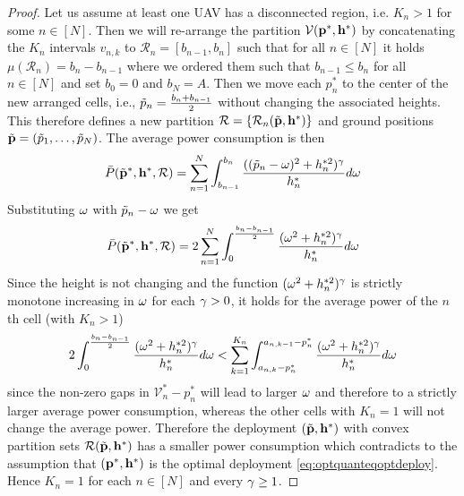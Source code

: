 \documentclass[smallabstract,smallcaptions]{dccpaper}
\newcommand{\Pbar}{\ensuremath{\bar{P}}}         %
\newcommand{\Vor}{\ensuremath{\mathcal{V}}}         %
\newcommand{\Rset}{\ensuremath{\mathcal R}}
\begin{document}
\begin{proof}
  Let us assume at least one UAV has a disconnected region, i.e. $K_n>1$ for some $n\in[N]$. Then we will re-arrange the
  partition $\Vor(\vp^*,\vh^*)$ by concatenating the $K_n$ intervals $v_{n,k}$ to $\Rset_n=[b_{n-1},b_{n}]$ such that for
  all $n\in[N]$ it holds $\mu(\Rset_n)=b_n-b_{n-1}$ where we ordered them such that $b_{n-1}\leq b_{n}$ for all $n\in[N]$
  and set $b_0=0$ and $b_N=A$. Then we move each $p_n^*$ to the center of the new arranged cells, i.e.,
  $\tilde{p}_n=\frac{b_n+b_{n-1}}{2}$ without changing the associated heights. This therefore defines a new partition
  $\Rset=\{\Rset_n(\tvp,\vh^*)\}$ and ground positions $\tilde{{\mathbf p}}=(\tilde{p}_1,\dots,\tilde{p}_N)$. The average power consumption is then
  \begin{align}
    \Pbar(\tvp^*,\vh^*,\Rset)=\sum_{n=1}^N \int_{b_{n-1}}^{b_n} \frac{ ((\tp_n-\ome)^2+h_n^{*2})^{\gam}}{h_n^{*}} d\ome
  \end{align}
  Substituting $\omega$ with $\tilde{p}_n-\omega$ we get 
  \begin{align}
    \Pbar(\tvp^*,\vh^*,\Rset)= 2\sum_{n=1}^N \int_{0}^{\frac{b_n-b_{n-1}}{2}} \frac{ (\ome^2+h_n^{*2})^{\gam}}{h_n^{*}} d\ome
  \end{align}
  Since the height is not changing and the function $(\omega^2+h_n^{*2})^{\gamma}$ is strictly monotone increasing in $\omega$
  for each $\gamma>0$, it holds for the average power of the $n$th cell (with $K_n>1$)
  \begin{align}
    2\int_{0}^{\frac{b_n-b_{n-1}}{2}} \frac{ (\omega^2+h_n^{*2})^{\gamma}}{h_n^{*}} d\omega 
    < \sum_{k=1}^{K_n}\int_{a_{n,k}-p_n^*}^{a_{n,k-1}-p_n^*} \frac{ (\omega^2+h_n^{*2})^{\gamma}}{h_n^{*}} d\omega
  \end{align}
  since the non-zero gaps in $\Vor_n^*-p_n^*$ will lead to larger $\omega$ and therefore to a strictly larger average
  power consumption, whereas the other cells with $K_n=1$ will not change the average power.  Therefore the deployment
  $(\tilde{{\mathbf p}},{\mathbf h}^*)$ with convex partition sets  $\Rset(\tvp,\vh^*)$ has a smaller power consumption which contradicts to
  the assumption that $({\mathbf p}^*,{\mathbf h}^*)$ is the optimal deployment \eqref{eq:optquanteqoptdeploy}. Hence $K_n=1$ for each
  $n\in[N]$ and every $\gamma\geq 1$.


    







\end{proof}
\end{document}
